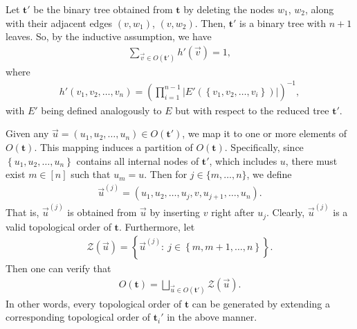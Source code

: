 \documentclass[superscriptaddress,onecolumn,nofootinbib,longbibliography,a4paper,accepted=2026-09-29]{quantumarticle}
\theoremstyle{plain}
\theoremstyle{definition}
\numberwithin{thm}{section}
\numberwithin{assumption}{section}
\numberwithin{lemma}{section}
\numberwithin{prop}{section}
\numberwithin{cor}{section}
\numberwithin{definition}{section}
\numberwithin{rmk}{section}
\numberwithin{equation}{section}
\newcommand{\lrb}[1]{\left ( #1 \right )}
\newcommand{\lrcb}[1]{\left \{ #1 \right \}}
\newcommand{\mbt}{\mathbf{t}}
\begin{document}
Let $\mbt'$ be the binary tree obtained from $\mbt$ by deleting the nodes $w_1$, $w_2$, along with their adjacent edges $(v, w_1)$, $(v, w_2)$. Then, $\mbt'$ is a binary tree with $n+1$ leaves. So, by the inductive assumption, we have
\begin{align}
    \sum_{\vec v \in O(\mbt')} h'(\vec v)=1,
    \label{eq:inductive_assumption_topological_order}
\end{align}
where 
\begin{align}
h'(v_1,v_2,\dots,v_n) = \lrb{\prod_{i=1}^{n-1} |E'(\lrcb{v_1, v_2, \dots, v_i})|}^{-1},
\end{align}
with $E'$ being defined analogously to $E$ but with respect to the reduced tree $\mbt'$. 

Given any $\vec u =(u_1, u_2, \dots, u_n) \in O(\mbt')$, we map it to one or more elements of $O(\mbt)$. This mapping induces a partition of $O(\mbt)$. Specifically, since $\lrcb{u_1, u_2, \dots, u_n}$ contains all internal nodes of $\mbt'$, which includes $u$, there must exist $m \in [n]$ such that $u_m=u$. Then for $j\in\{m, \dots, n\}$, we define
\begin{align}
    \vec u^{(j)}=(u_1, u_2, \dots, u_j, v, u_{j+1}, \dots, u_n).
\end{align}
That is, $\vec u^{(j)}$ is obtained from $\vec u$ by inserting $v$ right after $u_j$. Clearly, $\vec u^{(j)}$ is a valid topological order of $\mbt$. Furthermore, let
\begin{align}
    \mathcal{Z}(\vec u) = \lrcb{\vec u^{(j)}:~j\in \lrcb{m, m+1, \dots, n}}.
\end{align}
Then one can verify that
\begin{align}
    O(\mbt) = \bigsqcup_{\vec u \in O(\mbt')} \mathcal{Z}(\vec u).
    \label{eq:partition_topological_order_set}
\end{align}
In other words, every topological order of $\mbt$ can be generated by extending a corresponding topological order of $\mbt_i'$ in the above manner.
\end{document}
